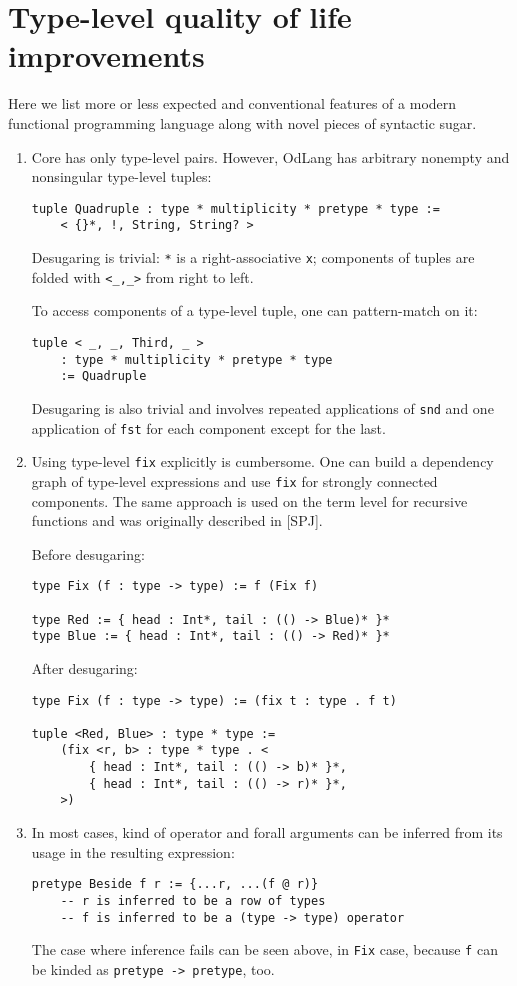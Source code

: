 \documentclass[a4paper,14pt]{extreport}
\begin{document}
\section{Type-level quality of life improvements}

Here we list more or less expected and conventional features of a modern
functional programming language along with novel pieces of syntactic sugar.

\begin{enumerate}
    \item Core has only type-level pairs. However, OdLang has arbitrary nonempty
        and nonsingular type-level tuples:
\begin{verbatim}
tuple Quadruple : type * multiplicity * pretype * type :=
    < {}*, !, String, String? >
\end{verbatim}
        Desugaring is trivial: \verb|*| is a right-associative \verb|x|;
        components of tuples are folded with \verb|<_,_>| from right to left.

        To access components of a type-level tuple, one can pattern-match on it:
\begin{verbatim}
tuple < _, _, Third, _ >
    : type * multiplicity * pretype * type
    := Quadruple
\end{verbatim}
        Desugaring is also trivial and involves repeated applications of
        \verb|snd| and one application of \verb|fst| for each component except
        for the last.
    \item Using type-level \verb|fix| explicitly is cumbersome. One can build a
        dependency graph of type-level expressions and use \verb|fix| for
        strongly connected components. The same approach is used on the term
        level for recursive functions and was originally described in [SPJ].

        Before desugaring:
\begin{verbatim}
type Fix (f : type -> type) := f (Fix f)

type Red := { head : Int*, tail : (() -> Blue)* }*
type Blue := { head : Int*, tail : (() -> Red)* }*
\end{verbatim}
        After desugaring:
\begin{verbatim}
type Fix (f : type -> type) := (fix t : type . f t)

tuple <Red, Blue> : type * type :=
    (fix <r, b> : type * type . <
        { head : Int*, tail : (() -> b)* }*,
        { head : Int*, tail : (() -> r)* }*,
    >)
\end{verbatim}
    \item In most cases, kind of operator and forall arguments can be inferred
        from its usage in the resulting expression:
\begin{verbatim}
pretype Beside f r := {...r, ...(f @ r)}
    -- r is inferred to be a row of types
    -- f is inferred to be a (type -> type) operator
\end{verbatim}
        The case where inference fails can be seen above, in \verb|Fix| case,
        because \verb|f| can be kinded as \verb|pretype -> pretype|, too.


\end{enumerate}
\end{document}
